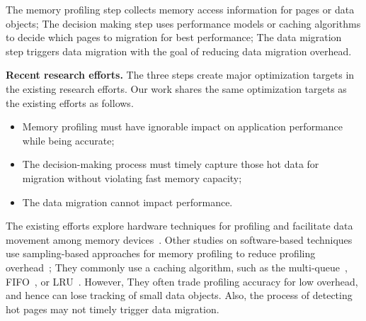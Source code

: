 The memory profiling step collects memory access information for pages or data objects; The decision making step uses performance models or caching algorithms to decide which pages to migration for best performance; The data migration step triggers data migration with the goal of reducing data migration overhead.

\textbf{Recent research efforts.}
The three steps create major optimization targets in the existing research efforts. %
Our work shares the same optimization targets as the existing efforts as follows.
\begin{itemize}[leftmargin=*]
    \item Memory profiling must have ignorable impact on application performance while being accurate;
    \item The decision-making process must timely capture those hot data for migration without violating fast memory capacity;
    \item The data migration cannot impact  performance. %
\end{itemize}

The existing efforts explore hardware techniques for profiling and facilitate data movement among memory devices~\cite{asplos15:agarwal,hetero_mem_arch,qureshi_micro09, ibm_isca09, Ramos:ics11,gpu_pcm_pact13,hpdc16:wu,row_buffer_pcm_iccd12}. Other studies on software-based techniques use sampling-based approaches for memory profiling to reduce profiling overhead~\cite{Thermostat:asplos17,RAMinate:socc16,heteros:isca17, unimem:sc17, sc18:wu}; They commonly use a caching algorithm, such as the multi-queue~\cite{RAMinate:socc16,Ramos:ics11, 5260554}, FIFO~\cite{Yan:ASPLOS19}, or LRU~\cite{heteros:isca17}. However, They often trade profiling accuracy for low overhead, and hence can lose tracking of small data objects. Also, the process of detecting hot pages may not timely trigger data migration. 

